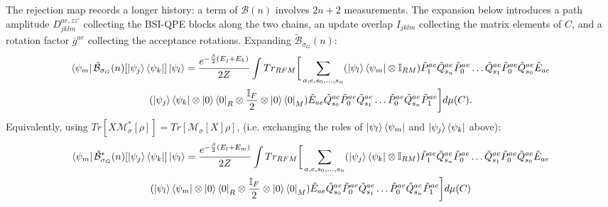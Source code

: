 \documentclass[aps,floatfix,10pt,amssymb,amsfont,amsmath,superscriptaddress,float,nofootinbib,longbibliography,nobalancelastpage,twocolumn]{revtex4-2}
\begin{document}
The rejection map records a longer history: a term of $\mathcal{B}(n)$ involves $2n+2$ measurements. The expansion below introduces a path amplitude $D^{ae,zz'}_{jklm}$ collecting the BSI-QPE blocks along the two chains, an update overlap $I_{jklm}$ collecting the matrix elements of $C$, and a rotation factor $\bar g^{ae}$ collecting the acceptance rotations. Expanding $\tilde{\mathcal{B}}_{\sigma_G}(n)$:
\begin{multline}
    \bra{\psi_m}\tilde{\mathcal{B}}_{\sigma_G}(n)[\ket{\psi_j}\bra{\psi_k}]\ket{\psi_l} = \frac{e^{-\frac{\beta}{2}(E_j+E_k)}}{2Z}\int Tr_{RFM}\bigg[ \sum_{a,e,s_0,\ldots,s_n}(\ket{\psi_l}\bra{\psi_m}\otimes \mathbb{I}_{RM})\tilde P^{ae}_1\tilde Q^{ae}_{s_n}\tilde P^{ae}_0\ldots\tilde Q^{ae}_{s_1}\tilde P^{ae}_0\tilde Q^{ae}_{s_0}\tilde E_{ae} \\(\ket{\psi_j}\bra{\psi_k}\otimes \ket{0}\bra{0}_R\otimes \frac{\mathbb{I}_F}{2}\otimes \ket{0}\bra{0}_M)  \tilde E_{ae}\tilde Q^{ae}_{s_0}\tilde P^{ae}_0\tilde Q^{ae}_{s_1}\ldots\tilde P^{ae}_0\tilde Q^{ae}_{s_n}\tilde P^{ae}_1\bigg]d\mu(C).
\end{multline}
Equivalently, using $Tr[X\mathcal{M}^*_{\sigma}[\rho]] = Tr[\mathcal{M}_{\sigma}[X]\rho]$, (i.e. exchanging the roles of $\ket{\psi_l}\bra{\psi_m}$ and $\ket{\psi_j}\bra{\psi_k}$ above):
\begin{multline}
       \bra{\psi_m}\tilde{\mathcal{B}}^*_{\sigma_G}(n)[\ket{\psi_j}\bra{\psi_k}]\ket{\psi_l} = \frac{e^{-\frac{\beta}{2}(E_l+E_m)}}{2Z}\int Tr_{RFM}\bigg[ \sum_{a,e,s_0,\ldots,s_n}(\ket{\psi_j}\bra{\psi_k}\otimes \mathbb{I}_{RM})\tilde P^{ae}_1\tilde Q^{ae}_{s_n}\tilde P^{ae}_0\ldots\tilde Q^{ae}_{s_1}\tilde P^{ae}_0\tilde Q^{ae}_{s_0}\tilde E_{ae} \\(\ket{\psi_l}\bra{\psi_m}\otimes \ket{0}\bra{0}_R\otimes \frac{\mathbb{I}_F}{2}\otimes \ket{0}\bra{0}_M)  \tilde E_{ae}\tilde Q^{ae}_{s_0}\tilde P^{ae}_0\tilde Q^{ae}_{s_1}\ldots\tilde P^{ae}_0\tilde Q^{ae}_{s_n}\tilde P^{ae}_1\bigg]d\mu(C)
    \label{eq:Bstarexpanded}
\end{multline}
\end{document}
